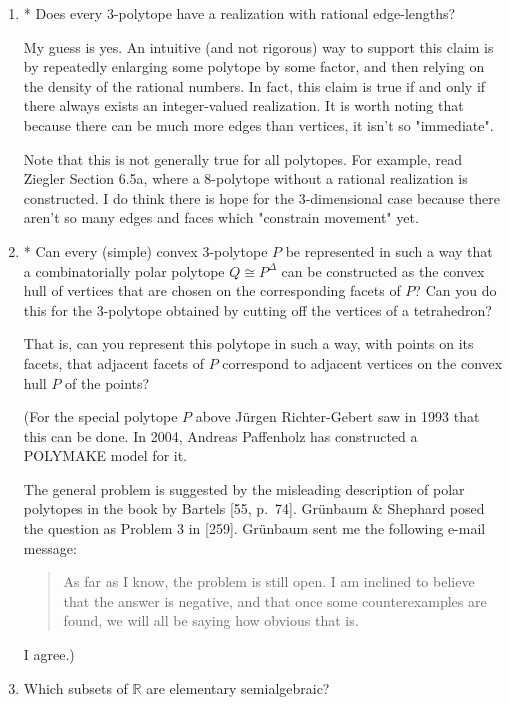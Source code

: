 \documentclass{article}
\begin{document}
\begin{enumerate}
\item* Does every $3$-polytope have a realization with rational edge-lengths?

\begin{solution}
    My guess is yes. An intuitive (and not rigorous) way to support this claim is by repeatedly enlarging some polytope by some factor, and then relying on the density of the rational numbers. In fact, this claim is true if and only if there always exists an integer-valued realization. It is worth noting that because there can be much more edges than vertices, it isn't so "immediate".

    Note that this is not generally true for all polytopes. For example, read Ziegler Section 6.5a, where a $8$-polytope without a rational realization is constructed. I do think there is hope for the 3-dimensional case because there aren't so many edges and faces which "constrain movement" yet.
\end{solution}

\item* Can every (simple) convex $3$-polytope $P$ be represented in such a way that a combinatorially polar polytope $Q \cong P^{\Delta}$ can be constructed as the convex hull of vertices that are chosen on the corresponding facets of $P$? Can you do this for the $3$-polytope obtained by cutting off the vertices of a tetrahedron? 

That is, can you represent this polytope in such a way, with points on its facets, that adjacent facets of $P$ correspond to adjacent vertices on the convex hull $P$ of the points? 

(For the special polytope $P$ above J\"urgen Richter-Gebert saw in 1993 that this can be done. In 2004, Andreas Paffenholz has constructed a POLYMAKE model for it. 

The general problem is suggested by the misleading description of polar polytopes in the book by Bartels [55, p.\ 74]. Gr\"unbaum \& Shephard posed the question as Problem 3 in [259]. Gr\"unbaum sent me the following e-mail message: 

\begin{quote} As far as I know, the problem is still open. I am inclined to believe that the answer is negative, and that once some counterexamples are found, we will all be saying how obvious that is. \end{quote} 

I agree.)

\item Which subsets of $\mathbb{R}$ are elementary semialgebraic?


\end{enumerate}
\end{document}
